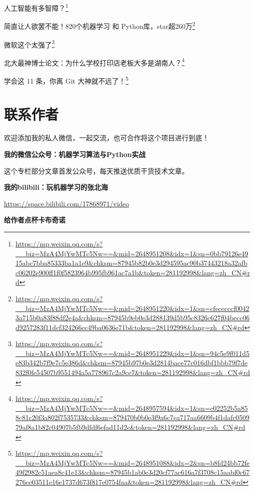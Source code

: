 \documentclass[]{ctexbook}
\renewcommand{\href}[2]{#2\footnote{\url{#1}}}
\begin{document}
\href{https://mp.weixin.qq.com/s?__biz=MzA4MjYwMTc5Nw==\&mid=2648951208\&idx=1\&sn=0bb79126e4915abc7bba85333ba1a1e9\&chksm=87945b82b0e3d294595ac90b37443218a32afbc06202e900ff1f0f5823964b995fb961ac7a1b\&token=281192998\&lang=zh_CN\#rd}{人工智能有多智障？}

\href{https://mp.weixin.qq.com/s?__biz=MzA4MjYwMTc5Nw==\&mid=2648951220\&idx=1\&sn=cfececccf00423a715b0a83f88df2e4a\&chksm=87945b9eb0e3d288139d5b95c8326c627f04becc06d9257283f11dcf324266cc49ba0636e71b\&token=281192998\&lang=zh_CN\#rd}{简直让人欲罢不能！820个机器学习 和 Python库，star超260万}

\href{https://mp.weixin.qq.com/s?__biz=MzA4MjYwMTc5Nw==\&mid=2648951229\&idx=1\&sn=94c5e9f011d5e83b342b7f9e7c5e386d\&chksm=87945b97b0e3d2814bace77c016dbf1bbb79f7de832f0fe54507b9551494a5a778967c2a9ce7\&token=281192998\&lang=zh_CN\#rd}{微软这个太强了}

\href{https://mp.weixin.qq.com/s?__biz=MzA4MjYwMTc5Nw==\&mid=2648957594\&idx=1\&sn=c02252b5a858c81c20f3a802f7535733\&chksm=879470b0b0e3f9a6c7ea717aa6609b4f1dafc050979af8a1b82c04907b5fb9dfdf6efad11d2c\&token=281192998\&lang=zh_CN\#rd}{北大最神博士论文：为什么学校打印店老板大多是湖南人？}

\href{https://mp.weixin.qq.com/s?__biz=MzA4MjYwMTc5Nw==\&mid=2648951088\&idx=2\&sn=b8fd24bb72fe49f2982c51aea8c41e13\&chksm=87945b1ab0e3d20cf77ac616a7f3708c15aabf0c67276ce03511e16e1737d673f817e0754faa\&token=281192998\&lang=zh_CN\#rd}{学会这 11 条，你离 Git 大神就不远了！}

\hypertarget{ux8054ux7cfbux4f5cux8005}{%
\chapter{联系作者}\label{ux8054ux7cfbux4f5cux8005}}

欢迎添加我的私人微信，一起交流，也可合作将这个项目进行到底！

\textbf{我的微信公众号：机器学习算法与Python实战}

这个专栏部分文章首发公众号，每天推送优质干货技术文章。

\textbf{我的bilibili：玩机器学习的张北海}

\url{https://space.bilibili.com/17868971/video}

\textbf{给作者点杯卡布奇诺}



\backmatter
\printindex
\end{document}
